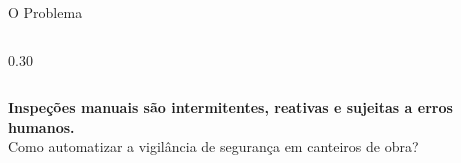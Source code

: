 \begin{frame}{O Problema}
\begin{columns}[c]
    \begin{column}{0.30\textwidth}
      \centering
    \end{column}
  \end{columns}

  \vspace{6mm}

  \begin{alertblock}{}
    \centering
    \textbf{Inspe\c{c}\~{o}es manuais s\~{a}o intermitentes, reativas e sujeitas a erros humanos.}\\[2pt]
    {\small Como automatizar a vigil\^{a}ncia de seguran\c{c}a em canteiros de obra?}
  \end{alertblock}
  \vfill
\end{frame}

